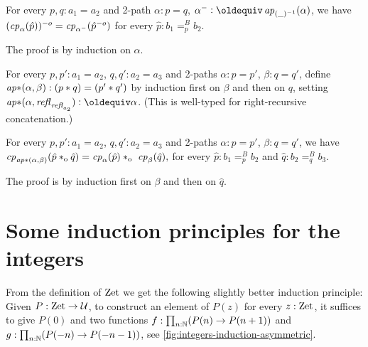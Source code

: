 \documentclass[a4,12pt]{amsart}
\begin{document}
\begin{lemma}\label{lem:inv-change-path}
  For every  $p,q:a_1=a_2$ and 2-path $\alpha : p = q$,
  $\alpha^- \defeq \ap{(\_)^{-1}}(\alpha)$, we have
  $(\mathit{cp}_{\alpha}(\hat p))^{-o} = \mathit{cp}_{\alpha^-}(\hat p^{-o})$
  for every $\hat p: b_1=^B_p b_2$.
\end{lemma}
 The proof is by induction on $\alpha$.

\begin{definition}\label{lem:concat-ap-ap}
  For every  $p,p':a_1=a_2$, $q,q':a_2=a_3$ and 2-paths 
  $\alpha : p = p'$, $\beta : q = q'$, define
  $\mathop{{\it ap}{*}}(\alpha,\beta): (p* q)=(p'* q')$ by induction
  first on $\beta$ and then on $q$, 
  setting $\apc(\alpha,\refl{\refl{a_2}}) \defeq \alpha$.
  (This is well-typed for right-recursive concatenation.)
\end{definition}

\begin{lemma}\label{lem:concat-change-path}
  For every  $p,p':a_1=a_2$, $q,q':a_2=a_3$ and 2-paths 
  $\alpha : p = p'$, $\beta : q = q'$, we have
  $\cp{\apc(\alpha,\beta)}(\hat p \cto \hat q) = 
   \cp{\alpha}(\hat p) \cto  \cp{\beta}(\hat q),$
  for every $\hat p: b_1=^B_p b_2$ and $\hat q: b_2=^B_q b_3$.
\end{lemma}
 The proof is by induction first on $\beta$ and then on $\hat q$.



\section{Some induction principles for the integers}
\label{sec:integers-induction}

From the definition of $\mathrm{Zet}$ we get the following slightly better induction principle:
Given $P : \mathrm{Zet} \to \mathcal{U}$, to construct an element of $P(z)$ for every $z : \mathrm{Zet}$,
it suffices to give $P(0)$ and two functions
$f : \prod_{n:\mathbb{N}}(P(n) \to P(n+1))$ and
$g : \prod_{n:\mathbb{N}}(P(-n) \to P(-n-1))$,
see \cref{fig:integers-induction-asymmetric}.
\end{document}
